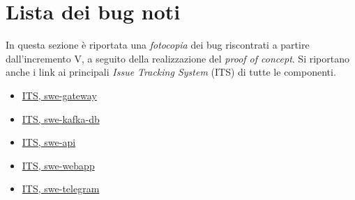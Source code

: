 

\newpage

\appendix
{}

\section{Lista dei bug noti}

In questa sezione è riportata una \textit{fotocopia} dei bug riscontrati a partire dall'incremento V, a seguito della realizzazione del \textit{proof of concept}. Si riportano anche i link ai principali \textit{Issue Tracking System} (ITS) di tutte le componenti.

	\begin{itemize}
		\item \href{https://github.com/RedRoundRobin/swe-gateway/issues}{ITS, swe-gateway}
		\item \href{https://github.com/RedRoundRobin/swe-kafka-db/issues}{ITS, swe-kafka-db}
		\item \href{https://github.com/RedRoundRobin/swe-api/issues}{ITS, swe-api}
		\item \href{https://github.com/RedRoundRobin/swe-webapp/issues}{ITS, swe-webapp}
		\item \href{https://github.com/RedRoundRobin/swe-telegram/issues}{ITS, swe-telegram}
	\end{itemize}

